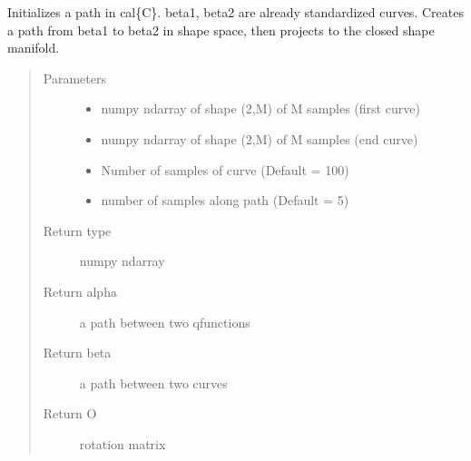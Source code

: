 \documentclass[letterpaper,10pt,english]{sphinxmanual}
\begin{document}
\begin{fulllineitems}
\label{\detokenize{geodesic:geodesic.init_path_geod}}
Initializes a path in cal\{C\}. beta1, beta2 are already
standardized curves. Creates a path from beta1 to beta2 in
shape space, then projects to the closed shape manifold.
\begin{quote}\begin{description}
\item[{Parameters}] \leavevmode\begin{itemize}
\item {} 
 \textendash{} numpy ndarray of shape (2,M) of M samples (first curve)

\item {} 
 \textendash{} numpy ndarray of shape (2,M) of M samples (end curve)

\item {} 
 \textendash{} Number of samples of curve (Default = 100)

\item {} 
 \textendash{} number of samples along path (Default = 5)

\end{itemize}

\item[{Return type}] \leavevmode
numpy ndarray

\item[{Return alpha}] \leavevmode
a path between two q\sphinxhyphen{}functions

\item[{Return beta}] \leavevmode
a path between two curves

\item[{Return O}] \leavevmode
rotation matrix

\end{description}\end{quote}

\end{fulllineitems}

\end{document}
